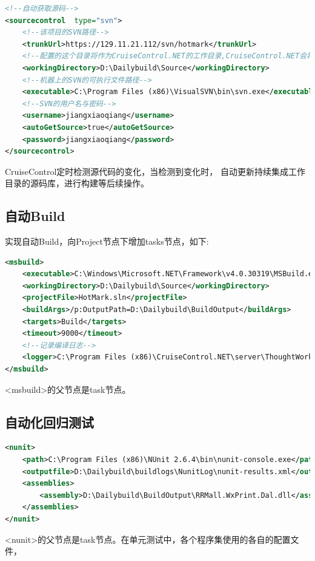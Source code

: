 \documentclass{book}
\begin{document}
\begin{lstlisting}[language=XML]
<!--自动获取源码-->
<sourcecontrol 	type="svn">
	<!--该项目的SVN路径-->
    <trunkUrl>https://129.11.21.112/svn/hotmark</trunkUrl>  
    <!--配置的这个目录将作为CruiseControl.NET的工作目录,CruiseControl.NET会将代码从SVN中check out到这个目录中.-->
    <workingDirectory>D:\Dailybuild\Source</workingDirectory>  
    <!--机器上的SVN的可执行文件路径-->
    <executable>C:\Program Files (x86)\VisualSVN\bin\svn.exe</executable>  
    <!--SVN的用户名与密码-->
    <username>jiangxiaoqiang</username>
	<autoGetSource>true</autoGetSource>
    <password>jiangxiaoqiang</password>
</sourcecontrol>
\end{lstlisting}

CruiseControl定时检测源代码的变化，当检测到变化时，
自动更新持续集成工作目录的源码库，进行构建等后续操作。

\subsection{自动Build}

实现自动Build，向Project节点下增加tasks节点，如下:
\begin{lstlisting}[language=XML]
<msbuild>			 
	<executable>C:\Windows\Microsoft.NET\Framework\v4.0.30319\MSBuild.exe</executable>         
	<workingDirectory>D:\Dailybuild\Source</workingDirectory> 
	<projectFile>HotMark.sln</projectFile> 
	<buildArgs>/p:OutputPath=D:\Dailybuild\BuildOutput</buildArgs> 
	<targets>Build</targets> 
	<timeout>9000</timeout> 
	<!--记录编译日志-->
	<logger>C:\Program Files (x86)\CruiseControl.NET\server\ThoughtWorks.CruiseControl.MSBuild.dll</logger>       
</msbuild>
\end{lstlisting}

<msbuild>的父节点是task节点。

\subsection{自动化回归测试}

\begin{lstlisting}[language=XML]
<nunit> 
	<path>C:\Program Files (x86)\NUnit 2.6.4\bin\nunit-console.exe</path>          
	<outputfile>D:\Dailybuild\buildlogs\NunitLog\nunit-results.xml</outputfile> 
	<assemblies> 
		<assembly>D:\Dailybuild\BuildOutput\RRMall.WxPrint.Dal.dll</assembly> 
	</assemblies> 
</nunit>
\end{lstlisting}

<nunit>的父节点是task节点。在单元测试中，各个程序集使用的各自的配置文件，
\end{document}
